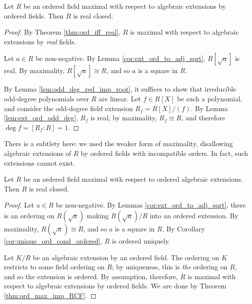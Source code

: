 \begin{theorem}
  \label{thm:ord_max_imp_RCF}
  Let $R$ be an ordered field maximal with respect to algebraic extensions by ordered fields. Then $R$ is real closed.
\end{theorem}
\begin{proof}
  By Theorem \ref{thm:ord_iff_real}, $R$ is maximal with respect to algebraic extensions by \textit{real} fields.

  Let $a\in R$ be non-negative. By Lemma \ref{cor:ext_ord_to_adj_sqrt}, $R[\sqrt{a}]$ is real. By maximality, $R[\sqrt{a}]\cong R$, and so $a$ is a square in $R$.

  By Lemma \ref{lem:odd_deg_red_imp_root}, it suffices to show that irreducible odd-degree polynomials over $R$ are linear. Let $f\in R[X]$ be such a polynomial, and consider the odd-degree field extension $R_f=R[X]/(f)$. By Lemma \ref{lem:ext_ord_odd_deg}, $R_f$ is real; by maximality, $R_f\cong R$, and therefore $\deg f=[R_f:R]=1$.
\end{proof}

There is a subtlety here: we used the weaker form of maximality, disallowing algebraic extensions of $R$ by ordered fields with incompatible orders. In fact, such extensions cannot exist.

\begin{corollary}
  \label{cor:ord_max_imp_RCF_strong}
  Let $R$ be an ordered field maximal with respect to ordered algebraic extensions. Then $R$ is real closed.
\end{corollary}
\begin{proof}
  Let $a\in R$ be non-negative. By Lemmas \ref{cor:ext_ord_to_adj_sqrt}, there is an ordering on $R(\sqrt{a})$ making $R(\sqrt{a})/R$ into an ordered extension. By maximality, $R(\sqrt{a})\cong R$, and so $a$ is a square in $R$. By Corollary \ref{cor:unique_ord_cond_ordered}, $R$ is ordered uniquely.

  Let $K/R$ be an algebraic extension by an ordered field. The ordering on $K$ restricts to some field ordering on $R$; by uniqueness, this is \textit{the} ordering on $R$, and so the extension is ordered. By assumption, therefore, $R$ is maximal with respect to algebraic extensions by ordered fields. We are done by Theorem \ref{thm:ord_max_imp_RCF}.
\end{proof}


